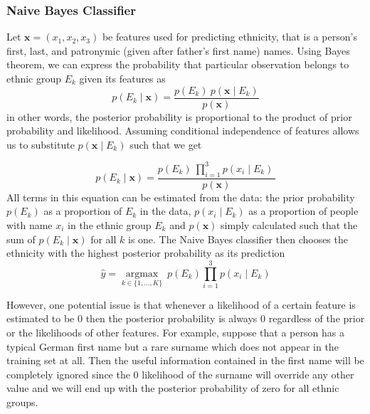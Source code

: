 \subsubsection{Naive Bayes Classifier}
Let  $\boldsymbol{x} = \left(x_1, x_2, x_3\right)$ be features used for predicting ethnicity, that is a person's first, last, and patronymic (given after father's first name) names. Using Bayes theorem, we can express the probability that particular observation  belongs to ethnic group $E_k$ given its features as
\begin{equation}
p(E_k \mid \mathbf{x}) = \frac{p(E_k) \ p(\mathbf{x} \mid E_k)}{p(\mathbf{x})}
\end{equation}
in other words, the posterior probability is proportional to the product of prior probability and likelihood. 
Assuming conditional independence of features allows us to substitute $p(\mathbf{x} \mid E_k)$ such that we get

\begin{equation}
p(E_k \mid \mathbf{x}) = \frac{p(E_k) \  \prod_{i=1}^3 p(x_i \mid E_k)\,}{p(\mathbf{x})}
\end{equation}
 All terms in this equation can be estimated from the data: the prior probability $p(E_k)$ as a proportion of $E_k$ in the data, $p(x_i \mid E_k)$ as a proportion of people with name $x_i$ in the ethnic group $E_k$ and $p(\mathbf{x})$ simply calculated such that the sum of $p(E_k \mid \mathbf{x})$ for all $k$ is one. 
The Naive Bayes classifier then chooses the ethnicity with the highest posterior probability as its prediction
\begin{equation}
    \hat{y} = \underset{k \in \{1, \dots, K\}}{\operatorname{argmax}} \ p(E_k) \displaystyle\prod_{i=1}^{3} p(x_i \mid E_k)
\end{equation}

However, one potential issue is that whenever a likelihood of a certain feature is estimated to be 0 then the posterior probability is always 0 regardless of the prior  or the likelihoods of other features. For example, suppose that a person has a typical German first name but a rare surname which does not appear in the training set at all. 
Then the useful information contained in the first name will be completely ignored since the 0 likelihood of the surname will override any other value and we will end up with the posterior probability of zero for all ethnic groups.

